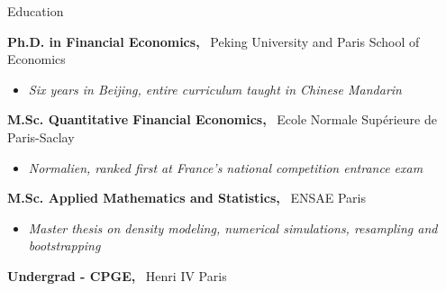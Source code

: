 \documentclass[usegeometry, 10pt, a4paper]{cv} %
\newcommand{\activite}[1]{\textbf{#1}\ }
\begin{document}
\begin{rubriquetableau}[0.95\textwidth]{Education}\\
\vspace{-0.5cm}

\activite{Ph.D. in Financial Economics,} Peking University and Paris School of Economics\\
\vspace{-0.8cm}  
\begin{itemize}[label={},
  rightmargin=\dimexpr\linewidth-13cm-\leftmargin\relax]
\item \small{\emph{Six years in Beijing, entire curriculum taught in Chinese Mandarin}}
\end{itemize}

\vspace{0.2cm}

\activite{M.Sc. Quantitative Financial Economics,} Ecole Normale Supérieure
de Paris-Saclay \\
\vspace{-0.3cm}
\begin{itemize}[label={}, rightmargin=\dimexpr\linewidth-13cm-\leftmargin\relax]
\item \small{\emph{Normalien, ranked first at France's national competition entrance exam}}
\end{itemize}

\vspace{0.2cm}


\activite{M.Sc. Applied Mathematics and Statistics,} ENSAE Paris\\
\vspace{-0.3cm}
\begin{itemize}[label={}, rightmargin=\dimexpr\linewidth-13cm-\leftmargin\relax]
\item \small{\emph{Master thesis on density modeling, numerical simulations, resampling and bootstrapping}}
\end{itemize}

\activite{Undergrad - CPGE,} Henri IV Paris
\end{rubriquetableau}
\end{document}
